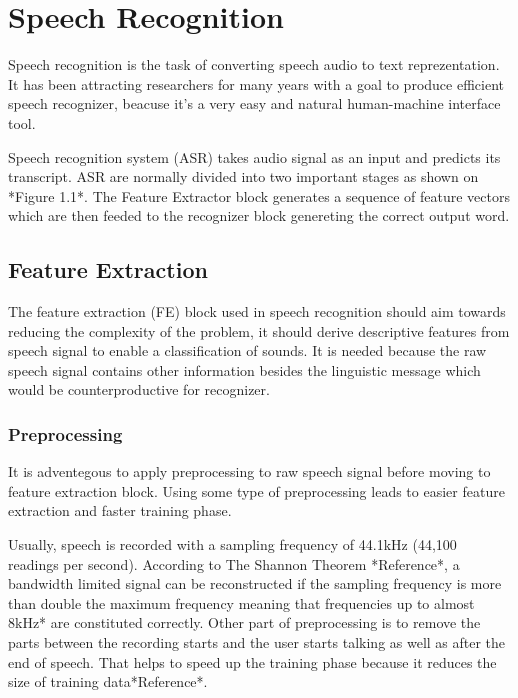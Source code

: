 \chapter{Speech Recognition}

Speech recognition is the task of converting speech audio to text reprezentation.
It has been attracting researchers for many years with a goal to produce efficient speech recognizer, beacuse it's a very easy and natural human-machine interface tool.

Speech recognition system (ASR) takes audio signal as an input and predicts its transcript.
ASR are normally divided into two important stages as shown on *Figure 1.1*.
The Feature Extractor block generates a sequence of feature vectors which are then feeded to the recognizer block genereting the correct output word.


\section{Feature Extraction}

The feature extraction (FE) block used in speech recognition should aim towards reducing the complexity of the problem,
it should derive descriptive features from speech signal to enable a classification of sounds.
It is needed because the raw speech signal contains other information besides the linguistic message which would be counterproductive for recognizer.



\subsection{Preprocessing}

It is adventegous to apply preprocessing to raw speech signal before moving to feature extraction block.
Using some type of preprocessing leads to easier feature extraction and faster training phase.

Usually, speech is recorded with a sampling frequency of 44.1kHz (44,100 readings per second). According to The Shannon Theorem *Reference*,
a bandwidth limited signal can be reconstructed if the sampling frequency is more than double the maximum frequency meaning that frequencies up to almost 8kHz* are constituted correctly.
Other part of preprocessing is to remove the parts between the recording starts and the user starts talking as well as after the end of speech.
That helps to speed up the training phase because it reduces the size of training data*Reference*.

